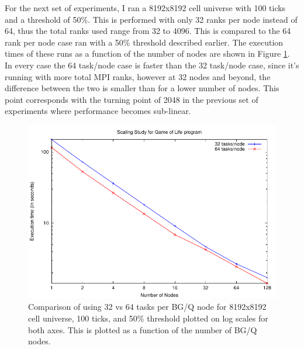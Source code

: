 \documentclass[11pt]{article}
\numberwithin{figure}{section}
\begin{document}
   
For the next set of experiments, I ran a 8192x8192 cell universe with 100 ticks and a threshold of 50\%.  This is performed with only 32 ranks per node instead of 64, thus the total ranks used range from 32 to 4096.  This is compared to the 64 rank per node case ran with a 50\% threshold described earlier.  The execution times of these runs as a function of the number of nodes are shown in Figure \ref{fig:scaling50}.  In every case the 64 task/node case is faster than the 32 task/node case, since it's running with more total MPI ranks, however at 32 nodes and beyond, the difference between the two is smaller than for a lower number of nodes.  This point corresponds with the turning point of 2048 in the previous set of experiments where performance becomes sub-linear.  
\begin{figure}[t]
\centering
   \includegraphics{data/scaling-t50-2.pdf}
\caption{Comparison of using 32 vs 64 tasks per BG/Q node for 8192x8192 cell universe, 100 ticks, and 50\% threshold plotted on log scales for both axes. This is plotted as a function of the number of BG/Q nodes.}
\label{fig:scaling50}
\end{figure}








%

%
\end{document}

